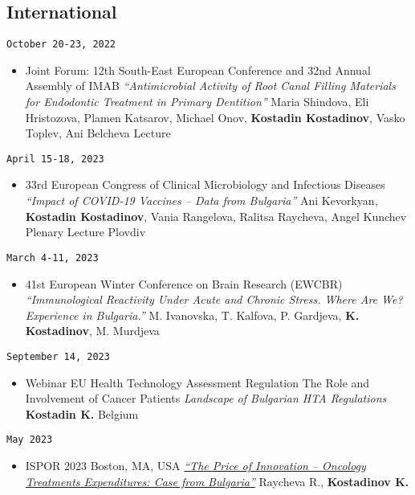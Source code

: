 \documentclass[
  12pt,
  letterpaper,
  DIV=11,
  numbers=noendperiod]{scrartcl}
\providecommand{\tightlist}{%
  \setlength{\itemsep}{0pt}\setlength{\parskip}{0pt}}\usepackage{longtable,booktabs,array}
\begin{document}
\subsection{International}\label{international-1}

\texttt{October\ 20-23,\ 2022}

\begin{itemize}
\tightlist
\item
  Joint Forum: 12th South-East European Conference and 32nd Annual
  Assembly of IMAB \textbar{} \emph{``Antimicrobial Activity of Root
  Canal Filling Materials for Endodontic Treatment in Primary
  Dentition''} \textbar{} Maria Shindova, Eli Hristozova, Plamen
  Katsarov, Michael Onov, \textbf{Kostadin Kostadinov}, Vasko Toplev,
  Ani Belcheva \textbar{} Lecture
\end{itemize}

\texttt{April\ 15-18,\ 2023}

\begin{itemize}
\tightlist
\item
  33rd European Congress of Clinical Microbiology and Infectious
  Diseases \textbar{} \emph{``Impact of COVID-19 Vaccines -- Data from
  Bulgaria''} \textbar{} Ani Kevorkyan, \textbf{Kostadin Kostadinov},
  Vania Rangelova, Ralitsa Raycheva, Angel Kunchev \textbar{} Plenary
  Lecture \textbar{} Plovdiv
\end{itemize}

\texttt{March\ 4-11,\ 2023}

\begin{itemize}
\tightlist
\item
  41st European Winter Conference on Brain Research (EWCBR) \textbar{}
  \emph{``Immunological Reactivity Under Acute and Chronic Stress. Where
  Are We? Experience in Bulgaria.''} \textbar{} M. Ivanovska, T.
  Kalfova, P. Gardjeva, \textbf{K. Kostadinov}, M. Murdjeva
\end{itemize}

\texttt{September\ 14,\ 2023}

\begin{itemize}
\tightlist
\item
  Webinar \textbar{} EU Health Technology Assessment Regulation
  \textbar{} The Role and Involvement of Cancer Patients \textbar{}
  \emph{Landscape of Bulgarian HTA Regulations} \textbar{}
  \textbf{Kostadin K.} \textbar{} Belgium
\end{itemize}

\texttt{May\ 2023}

\begin{itemize}
\tightlist
\item
  ISPOR 2023 \textbar{} Boston, MA, USA \textbar{}
  \href{https://www.ispor.org/heor-resources/presentations-database/presentation/intl2023-3665/126756}{\emph{``The
  Price of Innovation -- Oncology Treatments Expenditures: Case from
  Bulgaria''}} \textbar{} Raycheva R., \textbf{Kostadinov K.}
\end{itemize}
\end{document}
